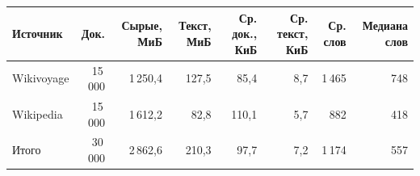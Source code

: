 \begin{tabular}{|l|r|r|r|r|r|r|r|}
\hline
Источник & Док. & Сырые, МиБ & Текст, МиБ & Ср. док., КиБ & Ср. текст, КиБ & Ср. слов & Медиана слов \\
\hline
Wikivoyage & 15\,000 & 1\,250,4 & 127,5 & 85,4 & 8,7 & 1\,465 & 748 \\
\hline
Wikipedia & 15\,000 & 1\,612,2 & 82,8 & 110,1 & 5,7 & 882 & 418 \\
\hline
Итого & 30\,000 & 2\,862,6 & 210,3 & 97,7 & 7,2 & 1\,174 & 557 \\
\hline
\end{tabular}
